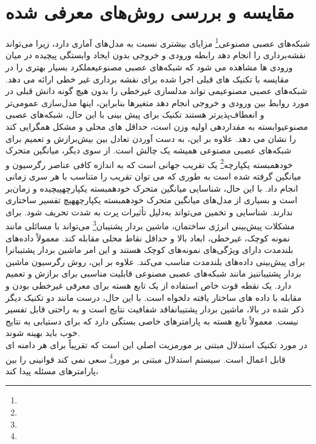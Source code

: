 \section{مقایسه و بررسی روش‌های معرفی شده}
شبکه‌های عصبی مصنوعی\footnote{} مزایای بیشتری نسبت به مدل‌های آماری دارد، زیرا می‌تواند نقشه‌برداری را انجام دهد
رابطه ورودی و خروجی بدون ایجاد وابستگی پیچیده
در میان ورودی ها مشاهده می شود که شبکه‌های عصبی مصنوعی\footnotemark[4] عملکرد بسیار بهتری را در مقایسه با تکنیک های قبلی
 اجرا شده برای نقشه برداری غیر خطی ارائه می دهد. شبکه‌های عصبی مصنوعی\footnotemark[4] می تواند مدلسازی غیرخطی را بدون هیچ گونه دانش قبلی در مورد روابط بین ورودی و خروجی انجام دهد
متغیرها بنابراین، اینها مدل‌سازی عمومی‌تر و انعطاف‌پذیرتر هستند
تکنیک برای پیش بینی با این حال، شبکه‌های عصبی مصنوعی\footnotemark[4] وابسته به مقداردهی اولیه وزن است، حداقل های محلی و مشکل همگرایی کند را نشان می دهد. علاوه بر این،
 به دست آوردن تعادل
  بین بیش‌برازش و تعمیم برای
   شبکه‌های عصبی مصنوعی همیشه یک چالش است. از سوی دیگر، میانگین متحرک خودهمبسته یکپارچه\footnote{} یک تقریب جهانی است که به اندازه کافی عناصر رگرسیون و میانگین گرفته شده است  به طوری که می توان تقریب
  را متناسب با هر سری زمانی
  انجام داد. با این حال، شناسایی میانگین متحرک خودهمبسته یکپارچه\footnotemark[5] پیچیده و زمان‌بر است و بسیاری از مدل‌های میانگین متحرک خودهمبسته یکپارچه\footnotemark[5] هیچ تفسیر ساختاری ندارند. شناسایی و تخمین می‌تواند
   به‌دلیل تأثیرات پرت به شدت تحریف شود.
   برای مشکلات پیش‌بینی انرژی ساختمان، ماشین بردار پشتیبان\footnote{} می‌تواند با مسائلی مانند نمونه کوچک، غیرخطی، ابعاد بالا و حداقل نقاط محلی مقابله کند. 
   معمولاً داده‌های بلندمدت دارای ویژگی‌های نمونه‌های کوچک هستند و این امر ماشین بردار پشتیبان\footnotemark[6] را برای پیش‌بینی داده‌های بلندمدت مناسب می‌کند.
    علاوه بر این، روش رگرسیون ماشین بردار پشتیبان\footnotemark[6] نیز مانند شبکه‌های عصبی مصنوعی قابلیت مناسبی برای برازش و تعمیم دارد. یک نقطه قوت خاص استفاده از یک تابع هسته برای معرفی غیرخطی بودن
     و مقابله با داده های ساختار یافته دلخواه است. 
    با این حال، درست مانند دو تکنیک دیگر ذکر شده در بالا، ماشین بردار پشتیبان\footnotemark[6] فاقد شفافیت نتایج است و به راحتی قابل تفسیر نیست. معمولاً تابع هسته به پارامترهای خاصی بستگی دارد
 که برای دستیابی به نتایج خوب باید بهینه شوند.
 \\
 در مورد تکنیک استدلال مبتنی بر مور\footnotemark[7] مزیت اصلی این است که تقریباً برای هر دامنه ای قابل اعمال است. سیستم استدلال مبتنی بر مورد\footnote{} سعی نمی کند قوانینی را بین پارامترهای مسئله پیدا کند،
